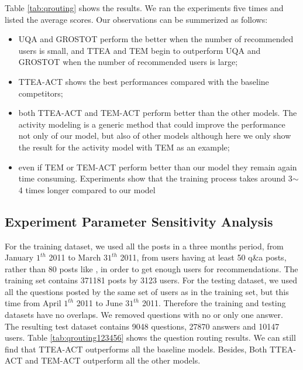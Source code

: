 {{{{{{{Table \ref{tab:qrouting} shows the results. We ran the experiments five times and listed the average scores. Our observations can be summerized as follows:
\begin{itemize}
    \item UQA and GROSTOT perform the better when the number of recommended users is small, and TTEA and TEM begin to outperform UQA and GROSTOT when the number of recommended users is large;
    \item TTEA-ACT shows the best performances compared with the baseline competitors;
    \item both TTEA-ACT and TEM-ACT perform better than the other models. The activity modeling is a generic method that could improve the performance not only of our model, but also of other models although here we only show the result for the activity model with TEM as an example;
    \item even if TEM or TEM-ACT perform better than our model they remain again time consuming. Experiments show that the training process takes around 3$\sim$4 times longer compared to our model
\end{itemize}   


\subsection{Experiment Parameter Sensitivity Analysis}
\label{sec:parasetting}



For the training dataset, we used all the posts in a three months period, from January $1^{th}$ 2011 to March $31^{th}$ 2011, from users having at least 50 q\&a posts, rather than 80 posts like \cite{yang2013cqarank}, in order to get enough users for recommendations. The training set contains 371181 posts by 3123 users. For the testing dataset, we used all the questions posted by the same set of users as in the training set, but this time from April $1^{th}$ 2011 to June $31^{th}$ 2011. Therefore the training and testing datasets have no overlaps. We removed questions with no or only one answer. The resulting test dataset contains 9048 questions, 27870 answers and 10147 users. 
Table \ref{tab:qrouting123456} shows the question routing results. We can still find that TTEA-ACT outperforms all the baseline models. Besides, Both TTEA-ACT and TEM-ACT outperform all the other models. 

}}}}}}}
